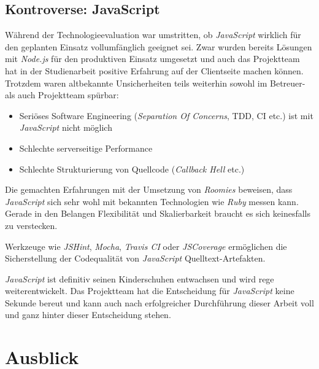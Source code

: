 \subsection*{Kontroverse: JavaScript}

Während der Technologieevaluation war umstritten, ob \emph{JavaScript} wirklich für den geplanten Einsatz vollumfänglich geeignet sei. Zwar wurden bereits Lösungen mit \emph{Node.js} für den produktiven Einsatz umgesetzt und auch das Projektteam hat in der Studienarbeit positive Erfahrung auf der Clientseite machen können. Trotzdem waren altbekannte Unsicherheiten teils weiterhin sowohl im Betreuer- als auch Projektteam spürbar:

\begin{itemize}
	\item Seriöses Software Engineering (\emph{Separation Of Concerns}, \gls{TDD}, CI etc.) ist mit \emph{JavaScript} nicht möglich
	\item Schlechte serverseitige Performance
	\item Schlechte Strukturierung von Quellcode (\emph{Callback Hell} etc.)
\end{itemize}

Die gemachten Erfahrungen mit der Umsetzung von \emph{Roomies} beweisen, dass \emph{JavaScript} sich sehr wohl mit bekannten Technologien wie \emph{Ruby} messen kann. Gerade in den Belangen Flexibilität und Skalierbarkeit braucht es sich keinesfalls zu verstecken.

Werkzeuge wie \emph{JSHint}, \emph{Mocha}, \emph{Travis CI} oder \emph{JSCoverage} ermöglichen die Sicherstellung der Codequalität von \emph{JavaScript} Quelltext-Artefakten.

\emph{JavaScript} ist definitiv seinen Kinderschuhen entwachsen und wird rege weiterentwickelt. Das Projektteam hat die Entscheidung für \emph{JavaScript} keine Sekunde bereut und kann auch nach erfolgreicher Durchführung dieser Arbeit voll und ganz hinter dieser Entscheidung stehen.


\section*{Ausblick}


